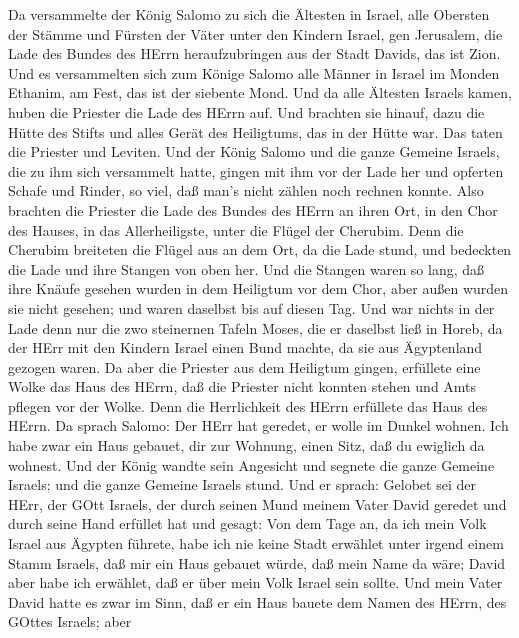  Da versammelte der König Salomo zu sich die Ältesten in
Israel, alle Obersten der Stämme und Fürsten der Väter unter den Kindern
Israel, gen Jerusalem, die Lade des Bundes des HErrn heraufzubringen aus
der Stadt Davids, das ist Zion.  Und es versammelten sich
zum Könige Salomo alle Männer in Israel im Monden Ethanim, am Fest, das
ist der siebente Mond.  Und da alle Ältesten Israels kamen,
huben die Priester die Lade des HErrn auf.  Und brachten sie
hinauf, dazu die Hütte des Stifts und alles Gerät des Heiligtums, das in
der Hütte war. Das taten die Priester und Leviten.  Und der
König Salomo und die ganze Gemeine Israels, die zu ihm sich versammelt
hatte, gingen mit ihm vor der Lade her und opferten Schafe und Rinder,
so viel, daß man's nicht zählen noch rechnen konnte.  Also
brachten die Priester die Lade des Bundes des HErrn an ihren Ort, in den
Chor des Hauses, in das Allerheiligste, unter die Flügel der Cherubim.
 Denn die Cherubim breiteten die Flügel aus an dem Ort, da
die Lade stund, und bedeckten die Lade und ihre Stangen von oben her.
 Und die Stangen waren so lang, daß ihre Knäufe gesehen
wurden in dem Heiligtum vor dem Chor, aber außen wurden sie nicht
gesehen; und waren daselbst bis auf diesen Tag.  Und war
nichts in der Lade denn nur die zwo steinernen Tafeln Moses, die er
daselbst ließ in Horeb, da der HErr mit den Kindern Israel einen Bund
machte, da sie aus Ägyptenland gezogen waren.  Da aber die
Priester aus dem Heiligtum gingen, erfüllete eine Wolke das Haus des
HErrn,  daß die Priester nicht konnten stehen und Amts
pflegen vor der Wolke. Denn die Herrlichkeit des HErrn erfüllete das
Haus des HErrn.  Da sprach Salomo: Der HErr hat geredet, er
wolle im Dunkel wohnen.  Ich habe zwar ein Haus gebauet,
dir zur Wohnung, einen Sitz, daß du ewiglich da wohnest. 
Und der König wandte sein Angesicht und segnete die ganze Gemeine
Israels; und die ganze Gemeine Israels stund.  Und er
sprach: Gelobet sei der HErr, der GOtt Israels, der durch seinen Mund
meinem Vater David geredet und durch seine Hand erfüllet hat und gesagt:
 Von dem Tage an, da ich mein Volk Israel aus Ägypten
führete, habe ich nie keine Stadt erwählet unter irgend einem Stamm
Israels, daß mir ein Haus gebauet würde, daß mein Name da wäre; David
aber habe ich erwählet, daß er über mein Volk Israel sein sollte.
 Und mein Vater David hatte es zwar im Sinn, daß er ein
Haus bauete dem Namen des HErrn, des GOttes Israels;  aber
